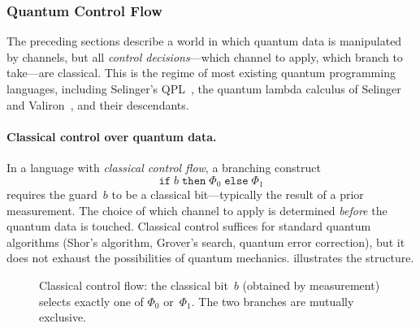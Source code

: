 \subsubsection{Quantum Control Flow}

The preceding sections describe a world in which quantum data is
manipulated by channels, but all \emph{control decisions}---which
channel to apply, which branch to take---are classical.
This is the regime of most existing quantum programming languages,
including Selinger's QPL~\cite{Selinger2004},
the quantum lambda calculus of Selinger and
Valiron~\cite{SelingerValiron2009}, and their descendants.

\paragraph{Classical control over quantum data.}
In a language with \emph{classical control flow}, a branching
construct
\[
  \mathtt{if}\;b\;\mathtt{then}\;\Phi_0\;\mathtt{else}\;\Phi_1
\]
requires the guard~$b$ to be a classical bit---typically the result of
a prior measurement.
The choice of which channel to apply is determined \emph{before} the
quantum data is touched.
Classical control suffices for standard quantum algorithms (Shor's
algorithm, Grover's search, quantum error correction), but it does not
exhaust the possibilities of quantum mechanics.
 illustrates the structure.

\begin{figure}[ht]
\centering
{}
\caption{Classical control flow: the classical bit~$b$ (obtained by
  measurement) selects exactly one of $\Phi_0$ or~$\Phi_1$.
  The two branches are mutually exclusive.}
\label{fig:classical-control}
\end{figure}

